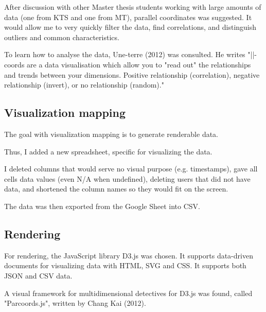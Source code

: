 After discussion with other Master thesis students working with large amounts of data (one from KTS and one from MT), parallel coordinates was suggested. It would allow me to very quickly filter the data, find correlations, and distinguish outliers and common characteristics.

To learn how to analyse the data, Une-terre (2012) was consulted. %
He writes "||-coords are a data visualisation which allow you to "read out" the relationships and trends between your dimensions. Positive relationship (correlation), negative relationship (invert), or no relationship (random)."


\subsection{Visualization mapping}
The goal with visualization mapping is to generate renderable data.

Thus, I added a new spreadsheet, specific for visualizing the data.

I deleted columns that would serve no visual purpose (e.g. timestamps), gave all cells data values (even N/A when undefined), deleting users that did not have data, and shortened the column names so they would fit on the screen.

The data was then exported from the Google Sheet into CSV.

\subsection{Rendering}

For rendering, the JavaScript library D3.js was chosen. It supports data-driven documents for visualizing data with HTML, SVG and CSS. It supports both JSON and CSV data.

A visual framework for multidimensional detectives for D3.js was found, called "Parcoords.js", written by Chang Kai (2012).

